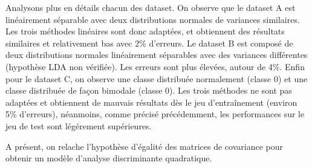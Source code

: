 \documentclass{article}
\begin{document}
\begin{enumerate}[label=(\alph*)]
Analysons plus en détails chacun des dataset. On observe que le dataset A est linéairement séparable avec deux distributions normales de variances similaires. Les trois méthodes linéaires sont donc adaptées, et obtiennent des résultats similaires et relativement bas avec 2\% d'erreurs. Le dataset B est composé de deux distributions normales linéairement séparables avec des variances différentes (hypothèse LDA non vérifiée). Les erreurs sont plus élevées, autour de 4\%. Enfin pour le dataset C, on observe une classe distribuée normalement (classe 0) et une classe distribuée de façon bimodale (classe 0). Les trois méthodes ne sont pas adaptées et obtiennent de mauvais résultats dès le jeu d'entraînement (environ 5\% d'erreurs), néanmoins, comme précisé précédemment, les performances sur le jeu de test sont légérement supérieures.
\end{enumerate}


A présent, on relache l'hypothèse d'égalité des matrices de covariance pour obtenir un modèle d'analyse discriminante quadratique.
\end{document}
